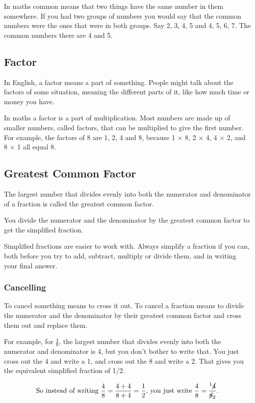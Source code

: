 \documentclass[16pt]{article}
\begin{document}
\begin{spacing}{1.25}
In maths common means that two things have the same number in them somewhere. If you had two groups of numbers you would say that the common numbers were the ones that were in both groups. Say 2, 3, 4, 5 and 4, 5, 6, 7. The common numbers there are 4 and 5.

\subsection*{Factor} In English, a factor means a part of something. People might talk about the factors of some situation, meaning the different parts of it, like how much time or money you have.

In maths a factor is a part of multiplication. Most numbers are made up of smaller numbers, called factors, that can be multiplied to give the first number. For example, the factors of 8 are 1, 2, 4 and 8, because 1 $\times$ 8, 2 $\times$ 4, 4 $\times$ 2, and 8 $\times$ 1 all equal 8.

\subsection*{Greatest Common Factor}
The largest number that divides evenly into both the numerator and denominator of a fraction is called the greatest common factor.

You divide the numerator and the denominator by the greatest common factor to get the simplified fraction.

Simplified fractions are easier to work with. Always simplify a fraction if you can, both before you try to add, subtract, multiply or divide them, and in writing your final answer.

\subsubsection*{Cancelling}
To cancel something means to cross it out. To cancel a fraction means to divide the numerator and the denominator by their greatest common factor and cross them out and replace them.

For example, for $\frac{4}{8}$, the largest number that divides evenly into both the numerator and denominator is 4, but you don't bother to write that. You just cross out the 4 and write a 1, and cross out the 8 and write a 2. That gives you the equivalent simplified fraction of 1/2.

$$\text{So instead of writing }\frac{4}{8} = \frac{4 \div 4}{8 \div 4} = \frac{1}{2}\text{, you just write }\frac{4}{8} = \frac{^1 \cancel{4}}{\cancel{8}_2}\text{.}$$


\end{spacing}
\end{document}
